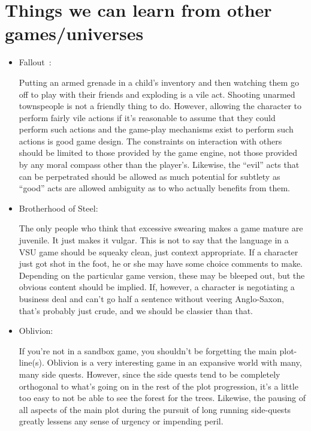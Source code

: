 \section{Things we can learn from other games/universes}
\label{learningFromOtherGames}
\begin{itemize}
\item Fallout~\cite{FalloutRPG}:

Putting an armed grenade in a child's inventory and then watching them
go off to play with their friends and exploding is a vile
act. Shooting unarmed townspeople is not a friendly thing to
do. However, allowing the character to perform fairly vile actions if
it's reasonable to assume that they could perform such actions and the
game-play mechanisms exist to perform such actions is good game
design. The constraints on interaction with others should be limited
to those provided by the game engine, not those provided by any moral
compass other than the player's. Likewise, the ``evil'' acts that can be perpetrated should be allowed as much potential for subtlety as ``good'' acts are allowed ambiguity as to who actually benefits from them. 

\item Brotherhood of Steel:

The only people who think that excessive swearing makes a game mature
are juvenile. It just makes it vulgar. This is not to say that the
language in a VSU game should be squeaky clean, just context
appropriate. If a character just got shot in the foot, he or she may
have some choice comments to make. Depending on the particular game
version, these may be bleeped out, but the obvious content should be
implied. If, however, a character is negotiating a business deal and
can't go half a sentence without veering Anglo-Saxon, that's probably
just crude, and we should be classier than that.

\item Oblivion:

If you're not in a sandbox game, you shouldn't be forgetting the main
plot-line(s).  Oblivion is a very interesting game in an expansive
world with many, many side quests. However, since the side quests tend
to be completely orthogonal to what's going on in the rest of the plot
progression, it's a little too easy to not be able to see the forest
for the trees. Likewise, the pausing of all aspects of the main plot during the pursuit of long running side-quests greatly lessens any sense of urgency or impending peril.


\end{itemize}

